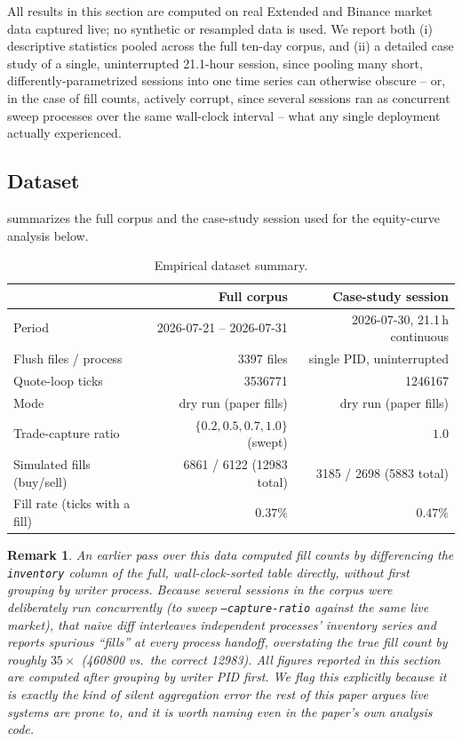 \documentclass[11pt,a4paper]{article}
\newtheorem{remark}{Remark}
\begin{document}
All results in this section are computed on real Extended and Binance market data captured live;
no synthetic or resampled data is used. We report both (i) descriptive statistics pooled across
the full ten-day corpus, and (ii) a detailed case study of a single, uninterrupted 21.1-hour
session, since pooling many short, differently-parametrized sessions into one time series can
otherwise obscure -- or, in the case of fill counts, actively corrupt, since several sessions ran
as concurrent sweep processes over the same wall-clock interval -- what any single deployment
actually experienced.

\subsection{Dataset}

 summarizes the full corpus and the case-study session used for the equity-curve
analysis below.

\begin{table}[htbp]
\centering
\small
\caption{Empirical dataset summary.}
\label{tab:dataset}
\begin{tabular}{@{}lrr@{}}
\toprule
& \textbf{Full corpus} & \textbf{Case-study session} \\
\midrule
Period & 2026-07-21 -- 2026-07-31 & 2026-07-30, 21.1\,h continuous \\
Flush files / process & \num{3397} files & single PID, uninterrupted \\
Quote-loop ticks & \num{3536771} & \num{1246167} \\
Mode & dry run (paper fills) & dry run (paper fills) \\
Trade-capture ratio & $\{0.2,0.5,0.7,1.0\}$ (swept) & $1.0$ \\
Simulated fills (buy/sell) & \num{6861} / \num{6122} (\num{12983} total) & \num{3185} / \num{2698}
  (\num{5883} total) \\
Fill rate (ticks with a fill) & $0.37\%$ & $0.47\%$ \\
\bottomrule
\end{tabular}
\end{table}

\begin{remark}
An earlier pass over this data computed fill counts by differencing the \texttt{inventory} column
of the full, wall-clock-sorted table directly, without first grouping by writer process. Because
several sessions in the corpus were deliberately run \emph{concurrently} (to sweep
\texttt{--capture-ratio} against the same live market), that naive diff interleaves independent
processes' inventory series and reports spurious ``fills'' at every process handoff, overstating
the true fill count by roughly $35\times$ (\num{460800} vs.\ the correct \num{12983}). All figures
reported in this section are computed after grouping by writer PID first. We flag this explicitly
because it is exactly the kind of silent aggregation error the rest of this paper argues live
systems are prone to, and it is worth naming even in the paper's own analysis code.
\end{remark}
\end{document}
